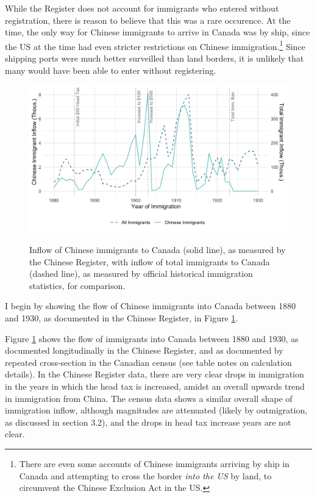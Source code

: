 \documentclass[12pt]{article}
\begin{document}
While the Register does not account for immigrants who entered without registration, there is reason to believe that this was a rare occurence. At the time, the only way for Chinese immigrants to arrive in Canada was by ship, since the US at the time had even stricter restrictions on Chinese immigration.\footnote{There are even some accounts of Chinese immigrants arriving by ship in Canada and attempting to cross the border \textit{into the US }by land, to circumvent the Chinese Exclusion Act in the US.} Since shipping ports were much better surveilled than land borders, it is unlikely that many would have been able to enter without registering. 


\begin{figure}[h!]
    \centering 
    \caption{Inflow of Chinese immigrants to Canada (solid line), as measured by the Chinese Register, with inflow of total immigrants to Canada (dashed line), as measured by official historical immigration statistics, for comparison.}
    \includegraphics[width=\textwidth]{../../figs/fig2_flow.png}
    \label{fig:inflow}
\end{figure}

I begin by showing the flow of Chinese immigrants into Canada between 1880 and 1930, as documented in the Chinese Register, in Figure \ref{fig:inflow}. 

Figure \ref{fig:inflow} shows the flow of immigrants into Canada between 1880 and 1930, as documented longitudinally in the Chinese Register, and as documented by repeated cross-section in the Canadian census (see table notes on calculation details). In the Chinese Register data, there are very clear drops in immigration in the years in which the head tax is increased, amidst an overall upwards trend in immigration from China. The census data shows a similar overall shape of immigration inflow, although magnitudes are attenuated (likely by outmigration, as discussed in section 3.2), and the drops in head tax increase years are not clear.  
\end{document}
